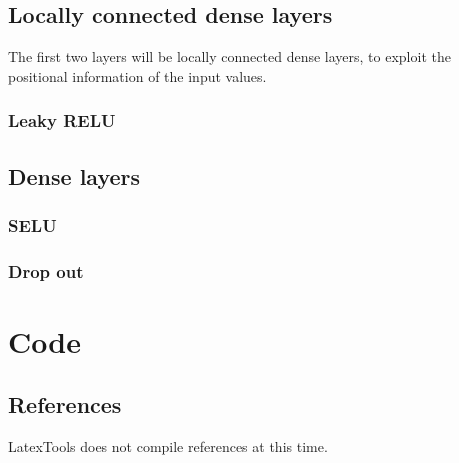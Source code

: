 \chapter{Locally connected dense layers}
The first two layers will be locally connected dense layers, to exploit the positional information of the input values.

\section{Leaky RELU}

\chapter{Dense layers}

\section{SELU}

\section{Drop out}

\part{Code}



\chapter{References}
LatexTools does not compile references at this time.

